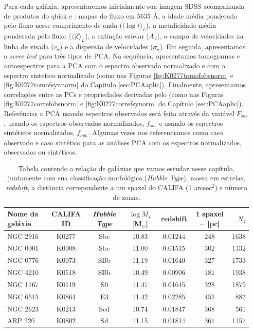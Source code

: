 Para cada galáxia, apresentaremos inicialmente sua imagem SDSS acompahanda de produtos do {\sc qbick} e \pycasso: mapas
do fluxo em 5635 \AA, a idade média ponderada pelo fluxo nesse comprimento de onda ($\langle \log t \rangle_L$), a
metalicidade média ponderada pelo fluxo ($\langle Z \rangle_L$), a extinção estelar ($A_V$), o campo de velocidades na
linha de visada ($v_\star$) e a dispersão de velocidades ($\sigma_\star$). Em seguida, apresentamos o {\em scree test}
para três tipos de PCA. Na sequência, apresentamos tomogramas e autoespectros para a PCA com o espectro observado
normalizado e com o espectro sintetico normalizado (como nas Figuras \ref{fig:K0277tomofobsnorm} e
\ref{fig:K0277tomofsynnorm} do Capítulo \ref{sec:PCAaplic}). Finalmente, apresentamos correlações entre as PCs e
propriedades derivadas pelo \starlight (como nas Figuras \ref{fig:K0277correfobsnorm} e \ref{fig:K0277correfsynorm} do
Capítulo \ref{sec:PCAaplic}). Referências a PCA usando espectros observados será feita através da variável $F_{obs}$,
usando os espectros observados normalizados, $f_{obs}$ e usando os espectros sintéticos normalizados, $f_{syn}$. Algumas
vezes nos referenciamos como caso observado e caso sintético para as análises PCA com os espectros normalizados,
observados ou sintéticos.

\begin{table}
	\caption[Relação de galáxias do CALIFA usadas neste trabalho.]
	{Tabela contendo a relação de galáxias que vamos estudar nesse capítulo, juntamente com sua classificação morfológica
	({\em Hubble Type}), massa em estrelas, {\em redshift}, a distância correpondente a um spaxel do CALIFA
	(1 arcsec$^2$) e número de zonas.}
	\begin{tabular}{l c c c c c r}
		Nome da galáxia & CALIFA ID & {\em Hubble Type} & $\log M_\star$ [M$_\odot$] & redshift & 1 spaxel $\sim$ [pc] &
		$N_z$ \\
		\midrule
		NGC 2916 & K0277 & Sbc & 10.83 & 0.01244 & $248$ & 1638 \\
		NGC 0001 & K0008 & Sbc & 11.00 & 0.01515 & $302$ & 1132 \\
		NGC 0776 & K0073 & SBb & 11.19 & 0.01640 & $327$ & 1733 \\
		NGC 4210 & K0518 & SBb & 10.49 & 0.00906 & $181$ & 1938 \\
		NGC 1167 & K0119 & S0  & 11.47 & 0.01645 & $328$ & 1879 \\
		NGC 6515 & K0864 & E3  & 11.42 & 0.02285 & $455$ & 887  \\
		NGC 2623 & K0213 & Scd & 10.74 & 0.01847 & $368$ & 561  \\
		ARP 220  & K0802 & Sd  & 11.15 & 0.01814 & $361$ & 1157 \\
	\end{tabular}
	\label{tab:amostraGalaxias}
\end{table}


